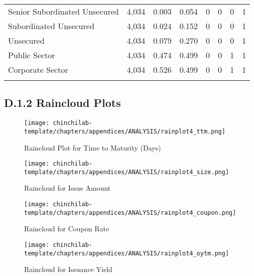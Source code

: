 \begin{table}[H]
\begin{tabular}{@{\extracolsep{5pt}}lccccccc}
Senior Subordinated Unsecured & 4,034 & 0.003 & 0.054 & 0 & 0 & 0 & 1 \\ 
Subordinated Unsecured & 4,034 & 0.024 & 0.152 & 0 & 0 & 0 & 1 \\ 
Unsecured & 4,034 & 0.079 & 0.270 & 0 & 0 & 0 & 1 \\ 
Public Sector & 4,034 & 0.474 & 0.499 & 0 & 0 & 1 & 1 \\ 
Corporate Sector & 4,034 & 0.526 & 0.499 & 0 & 0 & 1 & 1 \\ 
\hline \\[-1.8ex] 
\end{tabular} 
\end{table} 

\newpage

\subsection{D.1.2 Raincloud Plots}

\begin{figure}[h!]
    \centering
    \texttt{[image: chinchilab-template/chapters/appendices/ANALYSIS/rainplot4\_ttm.png]}
    \caption{Raincloud Plot for Time to Maturity (Days)}
    \label{fig:my_label}
\end{figure}

\begin{figure}[h!]
    \centering
    \texttt{[image: chinchilab-template/chapters/appendices/ANALYSIS/rainplot4\_size.png]}
    \caption{Raincloud for Issue Amount}
    \label{fig:my_label}
\end{figure}

\begin{figure}[h!]
    \centering
    \texttt{[image: chinchilab-template/chapters/appendices/ANALYSIS/rainplot4\_coupon.png]}
    \caption{Raincloud for Coupon Rate}
    \label{fig:my_label}
\end{figure}

\begin{figure}[h!]
    \centering
    \texttt{[image: chinchilab-template/chapters/appendices/ANALYSIS/rainplot4\_oytm.png]}
    \caption{Raincloud for Issuance Yield}
    \label{fig:my_label}
\end{figure}

\newpage

